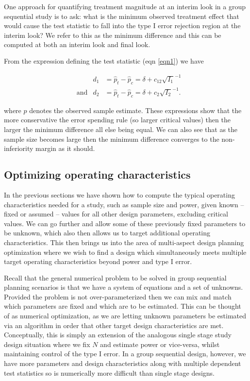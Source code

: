 \documentclass{article}
\begin{document}
One approach for quantifying treatment magnitude at an interim look in a group sequential study is to ask: what is the minimum observed treatment effect that would cause the test statistic to fall into the type I error rejection region at the interim look? We refer to this as the minimum difference and this can be computed at both an interim look and final look. 

From the expression defining the test statistic (eqn \ref{eqn1}) we have
\begin{fleqn}
\begin{align}
&&d_1&=\hat{p}_t-\hat{p}_c= \delta+ c_{12} \sqrt{I_{1}}^{-1}\label{eqmin1}\\
&\text{and}&d_2&=\hat{p}_t-\hat{p}_c= \delta+ c_2 \sqrt{I_{2}}^{-1}.\label{eqmin2}
\end{align}
\end{fleqn}
where $\hat{p}$ denotes the observed sample estimate. These expressions show that the more conservative the error spending rule (so larger critical values) then the larger the minimum difference all else being equal. We can also see that as the sample size becomes large then the minimum difference converges to the non-inferiority margin as it should. 

\subsection{Optimizing operating characteristics}\label{optmeth}
In the previous sections we have shown how to compute the typical operating characteristics needed for a study, such as sample size and power, given known -- fixed or assumed -- values for all other design parameters, excluding critical values. We can go further and allow some of these previously fixed parameters to be unknown, which also then allows us to target additional operating characteristics. This then brings us into the area of multi-aspect design planning optimization where we wish to find a design which simultaneously meets multiple target operating characteristics beyond power and type I error.  

Recall that the general numerical problem to be solved in group sequential planning scenarios is that we have a system of equations and a set of unknowns. Provided the problem is not over-parameterized then we can mix and match which parameters are fixed and which are to be estimated. This can be thought of as numerical optimization, as we are letting unknown parameters be estimated via an algorithm in order that other target design characteristics are met. Conceptually, this is simply an extension of the analogous single stage study design situation where we fix $N$ and estimate power or vice-versa, whilst maintaining control of the type I error. In a group sequential design, however, we have more parameters and design characteristics along with multiple dependent test statistics so is numerically more difficult than single stage designs.    
\end{document}
